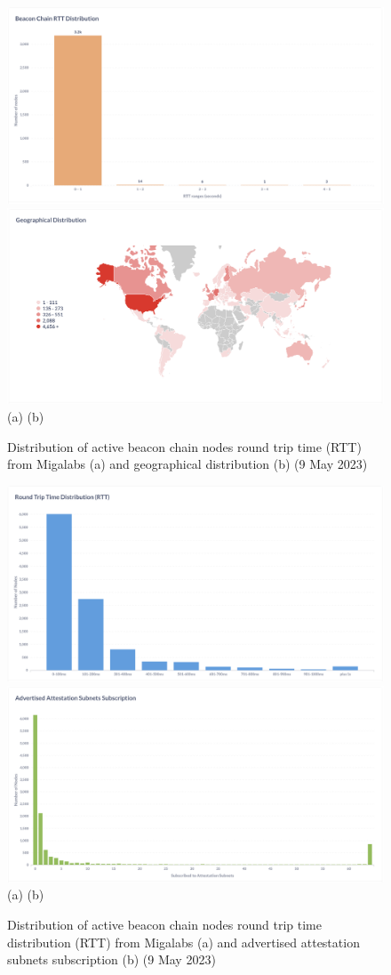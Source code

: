 \documentclass[UTF8]{article}
\begin{document}
\begin{figure}[htbp]
\begin{center}
\includegraphics[width=0.48\linewidth]{images/activertt}
\includegraphics[width=0.48\linewidth]{images/geographical} \\
(a)\hspace{160pt}        (b)\\
\caption{Distribution of active beacon chain nodes round trip time (RTT) from Migalabs (a) and geographical distribution (b) (9 May 2023)}
\label{fig:rtt}
\end{center}
\end{figure}

\begin{figure}[htbp]
\begin{center}
\includegraphics[width=0.48\linewidth]{images/rttdist}
\includegraphics[width=0.48\linewidth]{images/aass} \\
(a)\hspace{160pt}        (b)\\
\caption{Distribution of active beacon chain nodes round trip time distribution (RTT) from Migalabs (a) and advertised attestation subnets subscription (b) (9 May 2023)}
\label{fig:aass}
\end{center}
\end{figure}
\end{document}
